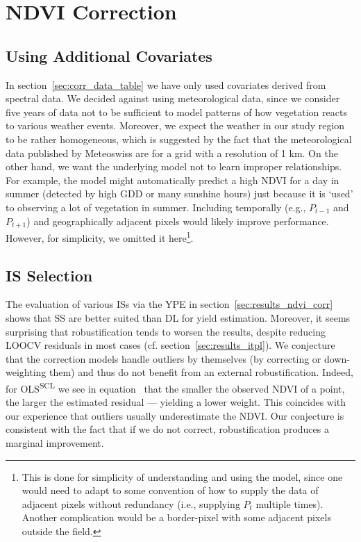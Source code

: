 \section{NDVI Correction}{\label{sec:discussion_corr}
  
    \subsection{Using Additional Covariates}{
        In section~\ref{sec:corr_data_table} we have only used covariates derived from spectral data. 
        We decided against using meteorological data, since we consider five years of data not to be sufficient to model patterns of how vegetation reacts to various weather events. Moreover, we expect the weather in our study region to be rather homogeneous, which is suggested by the fact that the meteorological data published by Meteoswiss are for a grid with a resolution of 1 km. On the other hand, we want the underlying model not to learn improper relationships. For example, the model might automatically predict a high NDVI for a day in summer (detected by high GDD or many sunshine hours) just because it is `used' to observing a lot of vegetation in summer. 
        Including temporally (e.g., $P_{t-1}$ and $P_{t+1}$) and geographically adjacent pixels would likely improve performance. However, for simplicity, we omitted it here\footnote{This is done for simplicity of understanding and using the model, since one would need to adapt to some convention of how to supply the data of adjacent pixels without redundancy (i.e., supplying $P_t$ multiple times). Another complication would be a border-pixel with some adjacent pixels outside the field.}.
    }

    \subsection{{{IS}} Selection}\label{sec:discussion_iplfstrategy-choose}

    The evaluation of various ISs via the YPE in section~\ref{sec:results_ndvi_corr} shows that SS are better suited than DL for yield estimation. Moreover, it seems surprising that robustification tends to worsen the results, despite reducing LOOCV residuals in most cases (cf. section~\ref{sec:results_itpl}). We conjecture that the correction models handle outliers by themselves (by correcting or down-weighting them) and thus do not benefit from an external robustification. Indeed, for OLS\textsuperscript{SCL} we see in equation~ that the smaller the observed NDVI of a point, the larger the estimated residual --- yielding a lower weight. This coincides with our experience that outliers usually underestimate the NDVI. Our conjecture is consistent with the fact that if we do not correct, robustification produces a marginal improvement. 
    
}
